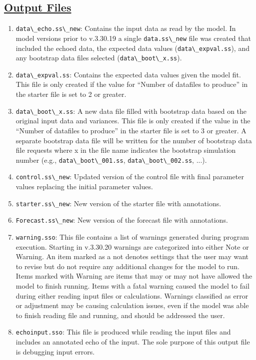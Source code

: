 	\subsection[Output Files]{\protect\hyperlink{OutputFilesList}{Output Files}}
	\begin{enumerate}
		\item \verb|data\_echo.ss\_new|: Contains the input data as read by the model. In model versions prior to v.3.30.19 a single \verb|data.ss\_new| file was created that included the echoed data, the expected data values (\verb|data\_expval.ss|), and any bootstrap data files selected (\verb|data\_boot\_x.ss|).
		\item \verb|data\_expval.ss|: Contains the expected data values given the model fit. This file is only created if the value for ``Number of datafiles to produce'' in the starter file is set to 2 or greater.
		\item \verb|data\_boot\_x.ss|: A new data file filled with bootstrap data based on the original input data and variances. This file is only created if the value in the ``Number of datafiles to produce'' in the starter file is set to 3 or greater. A separate bootstrap data file will be written for the number of bootstrap data file requests where x in the file name indicates the bootstrap simulation number (e.g., \verb|data\_boot\_001.ss|, \verb|data\_boot\_002.ss|, ...).
		\item \verb|control.ss\_new|: Updated version of the control file with final parameter values replacing the initial parameter values.
		\item \verb|starter.ss\_new|: New version of the starter file with annotations.
		\item \verb|Forecast.ss\_new|: New version of the forecast file with annotations.
		\item \verb|warning.sso|: This file contains a list of warnings generated during program execution. Starting in v.3.30.20 warnings are categorized into either Note or Warning. An item marked as a not denotes settings that the user may want to revise but do not require any additional changes for the model to run. Items marked with Warning are items that may or may not have allowed the model to finish running. Items with a fatal warning caused the model to fail during either reading input files or calculations. Warnings classified as error or adjustment may be causing calculation issues, even if the model was able to finish reading file and running, and should be addressed the user. 
		\item \verb|echoinput.sso|: This file is produced while reading the input files and includes an annotated echo of the input. The sole purpose of this output file is debugging input errors.

\end{enumerate}
